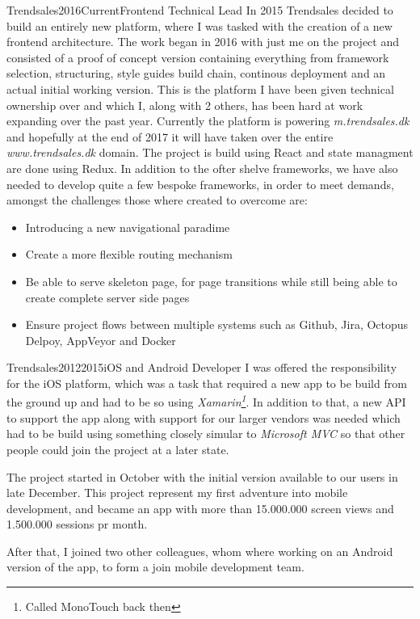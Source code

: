 \begin{cvexp}{Trendsales}{2016}{Current}{Frontend Technical Lead}
	In 2015 Trendsales decided to build an entirely new platform, where I was tasked with the creation of a new frontend architecture. The work began in 2016 with just me on the project and consisted of a proof of concept version containing everything from framework selection, structuring, style guides build chain, continous deployment and an actual initial working version. This is the platform I have been given technical ownership over and which I, along with 2 others, has been hard at work expanding over the past year. Currently the platform is powering \textit{m.trendsales.dk} and hopefully at the end of 2017 it will have taken over the entire \textit{www.trendsales.dk} domain. The project is build using React and state managment are done using Redux. In addition to the ofter shelve frameworks, we have also needed to develop quite a few bespoke frameworks, in order to meet demands, amongst the challenges those where created to overcome are:
	\begin{itemize}  
		\item Introducing a new navigational paradime
		\item Create a more flexible routing mechanism
		\item Be able to serve skeleton page, for page transitions while still being able to create complete server side pages
		\item Ensure project flows between multiple systems such as Github, Jira, Octopus Delpoy, AppVeyor and Docker
	\end{itemize} 
\end{cvexp}

\begin{cvexp}{Trendsales}{2012}{2015}{iOS and Android Developer}
 I was offered the responsibility for the iOS platform, which was a task that required a new app to be build from the ground up and had to be so using \textit{Xamarin\footnote{Called MonoTouch back then}}. In addition to that, a new API to support the app along with support for our larger vendors was needed which had to be build using something closely simular to \textit{Microsoft MVC} so that other people could join the project at a later state.
 
 The project started in October with the initial version available to our users in late December.
 This project represent my first adventure into mobile development, and became an app with more than 15.000.000 screen views and 1.500.000 sessions pr month.
 
 After that, I joined two other colleagues, whom where working on an Android version of the app, to form a join mobile development team. 
\end{cvexp}

